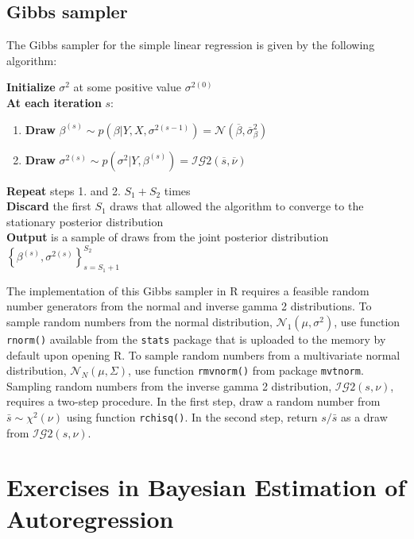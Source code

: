 \documentclass[
  letterpaper,
  DIV=11,
  numbers=noendperiod]{scrreprt}
\providecommand{\tightlist}{%
  \setlength{\itemsep}{0pt}\setlength{\parskip}{0pt}}\usepackage{longtable,booktabs,array}
\begin{document}
\hypertarget{gibbs-sampler}{%
\section{Gibbs sampler}\label{gibbs-sampler}}

The Gibbs sampler for the simple linear regression is given by the
following algorithm:

\textbf{Initialize} \(\sigma^2\) at some positive value
\(\sigma^{2(0)}\)\\
\textbf{At each iteration} \(s\):

\begin{enumerate}
\def\labelenumi{\arabic{enumi}.}
\tightlist
\item
  \textbf{Draw}
  \(\beta^{(s)}\sim p\left(\beta|Y,X,\sigma^{2(s-1)}\right) = \mathcal{N}\left(\overline{\beta}, \overline{\sigma}_{\beta}^2\right)\)
\item
  \textbf{Draw}
  \(\sigma^{2(s)}\sim p\left(\sigma^2|Y,\beta^{(s)}\right)=\mathcal{IG}2\left( \overline{s}, \overline{\nu} \right)\)
\end{enumerate}

\textbf{Repeat} steps 1. and 2. \(S_1 + S_2\) times\\
\textbf{Discard} the first \(S_1\) draws that allowed the algorithm to
converge to the stationary posterior distribution\\
\textbf{Output} is a sample of draws from the joint posterior
distribution
\(\left\{ \beta^{(s)}, \sigma^{2(s)} \right\}_{s=S_1+1}^{S_2}\)

The implementation of this Gibbs sampler in R requires a feasible random
number generators from the normal and inverse gamma 2 distributions. To
sample random numbers from the normal distribution,
\(\mathcal{N}_1\left( \mu, \sigma^2 \right)\), use function
\texttt{rnorm()} available from the \texttt{stats} package that is
uploaded to the memory by default upon opening R. To sample random
numbers from a multivariate normal distribution,
\(\mathcal{N}_N\left( \mu, \Sigma \right)\), use function
\texttt{rmvnorm()} from package \texttt{mvtnorm}. Sampling random
numbers from the inverse gamma 2 distribution,
\(\mathcal{IG}2\left( s, \nu \right)\), requires a two-step procedure.
In the first step, draw a random number from \(\bar{s}\sim\chi^2(\nu)\)
using function \texttt{rchisq()}. In the second step, return
\(s/\bar{s}\) as a draw from \(\mathcal{IG}2\left( s, \nu \right)\).

\hypertarget{exercises-in-bayesian-estimation-of-autoregression}{%
\chapter{Exercises in Bayesian Estimation of
Autoregression}\label{exercises-in-bayesian-estimation-of-autoregression}}
\end{document}
